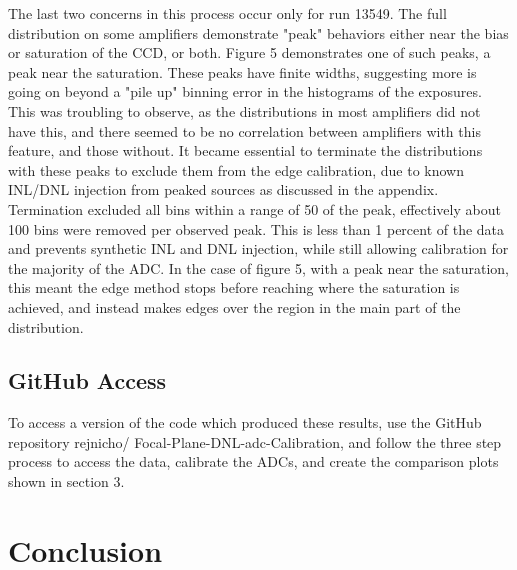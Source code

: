 \documentclass[11pt, letterpaper]{article}
\begin{document}
The last two concerns in this process occur only for run 13549.  
The full distribution on some amplifiers demonstrate "peak" behaviors either near the bias or saturation of the CCD, or both.
Figure 5 demonstrates one of such peaks, a peak near the saturation.  
These peaks have finite widths, suggesting more is going on beyond a "pile up" binning error in the histograms of the exposures. 
This was troubling to observe, as the distributions in most amplifiers did not have this, and there seemed to be no correlation between amplifiers with this feature, and those without. 
It became essential to terminate the distributions with these peaks to exclude them from the edge calibration, due to known INL/DNL injection from peaked sources as discussed in the appendix. 
Termination excluded all bins within a range of 50 of the peak, effectively about 100 bins were removed per observed peak. 
This is less than 1 percent of the data and prevents synthetic INL and DNL injection, while still allowing calibration for the majority of the ADC. 
In the case of figure 5, with a peak near the saturation, this meant the edge method stops before reaching where the saturation is achieved, and instead makes edges over the region in the main part of the distribution. 

\subsection{GitHub Access}
\indent 


To access a version of the code which produced these results, use the GitHub repository rejnicho/
Focal-Plane-DNL-adc-Calibration, and follow the three step process to access the data, calibrate the ADCs, and create the comparison plots shown in section 3. 

\section{Conclusion}
\indent
\end{document}
